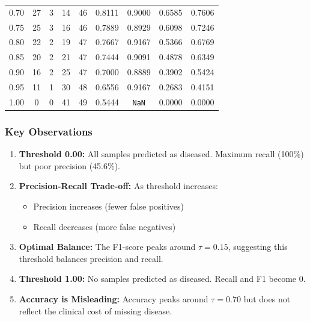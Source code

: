 \documentclass[11pt]{article}
\begin{document}
\begin{table}[H]
\begin{tabular}{ccccccccc}
        0.70 & 27 & 3 & 14 & 46 & 0.8111 & 0.9000 & 0.6585 & 0.7606 \\
        0.75 & 25 & 3 & 16 & 46 & 0.7889 & 0.8929 & 0.6098 & 0.7246 \\
        0.80 & 22 & 2 & 19 & 47 & 0.7667 & 0.9167 & 0.5366 & 0.6769 \\
        0.85 & 20 & 2 & 21 & 47 & 0.7444 & 0.9091 & 0.4878 & 0.6349 \\
        0.90 & 16 & 2 & 25 & 47 & 0.7000 & 0.8889 & 0.3902 & 0.5424 \\
        0.95 & 11 & 1 & 30 & 48 & 0.6556 & 0.9167 & 0.2683 & 0.4151 \\
        1.00 & 0 & 0 & 41 & 49 & 0.5444 & \texttt{NaN} & 0.0000 & 0.0000 \\
        \bottomrule
    \end{tabular}
    \label{tab:metrics_sweep}
\end{table}

\subsubsection{Key Observations}

\begin{enumerate}
    \item \textbf{Threshold 0.00:} All samples predicted as diseased. Maximum recall (100\%) but poor precision (45.6\%).
    
    \item \textbf{Precision-Recall Trade-off:} As threshold increases:
    \begin{itemize}
        \item Precision increases (fewer false positives)
        \item Recall decreases (more false negatives)
    \end{itemize}
    
    \item \textbf{Optimal Balance:} The F1-score peaks around $\tau = 0.15$, suggesting this threshold balances precision and recall.
    
    \item \textbf{Threshold 1.00:} No samples predicted as diseased. Recall and F1 become 0.
    
    \item \textbf{Accuracy is Misleading:} Accuracy peaks around $\tau = 0.70$ but does not reflect the clinical cost of missing disease.
\end{enumerate}
\end{document}
